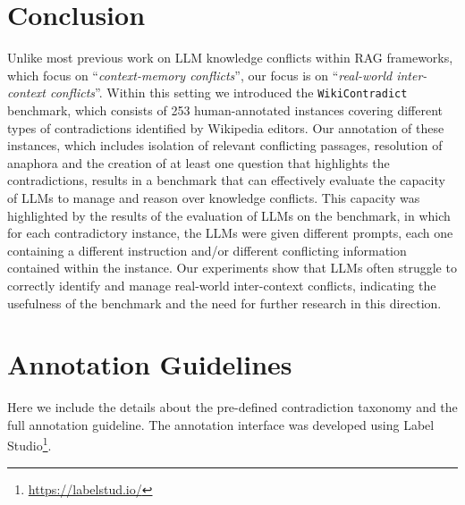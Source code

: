 \documentclass{article}
\begin{document}


\section{Conclusion}
\label{sec:conc}

Unlike most previous work on LLM knowledge conflicts within RAG frameworks, which focus on ``\emph{context-memory conflicts}'', our focus is on ``\emph{real-world inter-context conflicts}''. Within this setting we introduced the \texttt{WikiContradict} benchmark, which consists of 253 human-annotated instances covering different types of contradictions identified by Wikipedia editors. Our annotation of these instances, which includes isolation of relevant conflicting passages, resolution of anaphora and the creation of at least one question that highlights the contradictions, results in a benchmark that can effectively evaluate the capacity of LLMs to manage and reason over knowledge conflicts. This capacity was highlighted by the results of the evaluation of LLMs on the benchmark, in which for each contradictory instance, the LLMs were given different prompts, each one containing a different instruction and/or different conflicting information contained within the instance. Our experiments show that LLMs often struggle to correctly identify and manage real-world inter-context conflicts, indicating the usefulness of the benchmark and the need for further research in this direction. 







\newpage

\appendix


\section{Annotation Guidelines}

\label{appx:guidelines}

Here we include the details about the pre-defined contradiction taxonomy and the full annotation guideline. The annotation interface was developed using Label Studio\footnote{\url{https://labelstud.io/}}.



\end{document}
